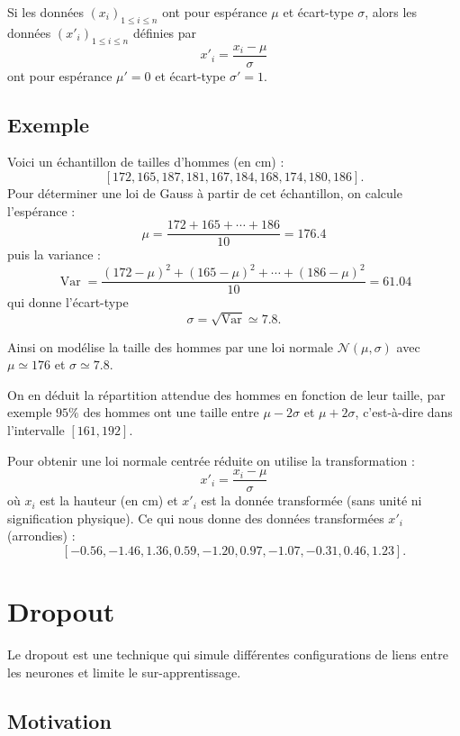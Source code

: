 \documentclass[11pt,class=report,crop=false]{standalone}
\begin{document}


Si les données $(x_i)_{1\le i \le n}$ ont pour espérance $\mu$ et écart-type $\sigma$,
alors les données $(x'_i)_{1\le i \le n}$ définies par 
$$x'_i = \frac{x_i-\mu}{\sigma}$$
ont pour espérance $\mu'=0$ et écart-type $\sigma'=1$.

\subsection{Exemple}
Voici un échantillon de tailles d'hommes (en cm) :
$$[172,165,187,181,167,184,168,174,180,186].$$
Pour déterminer une loi de Gauss à partir de cet échantillon, on calcule l'espérance :
$$\mu = \frac{172 + 165 + \cdots + 186}{10} = 176.4$$
puis la variance : 
$$\operatorname{Var} = \frac{(172-\mu)^2+(165-\mu)^2+\cdots + (186-\mu)^2}{10} = 61.04$$
qui donne l'écart-type
$$\sigma = \sqrt{\operatorname{Var}} \simeq 7.8.$$


Ainsi on modélise la taille des hommes par une loi normale $\mathcal{N}(\mu,\sigma)$
avec $\mu\simeq 176$ et $\sigma\simeq 7.8$.



On en déduit la répartition attendue des hommes en fonction de leur taille, par exemple 
$95\%$ des hommes ont une taille entre $\mu-2\sigma$ et $\mu+2\sigma$, c'est-à-dire dans l'intervalle $[161,192]$.

Pour obtenir une loi normale centrée réduite on utilise la transformation :
$$x'_i = \frac{x_i-\mu}{\sigma}$$
où $x_i$ est la hauteur (en cm) et $x'_i$ est la donnée transformée (sans unité ni signification physique).
Ce qui nous donne des données transformées $x'_i$ (arrondies) :
$$[-0.56, -1.46, 1.36,  0.59, -1.20,  0.97,  -1.07, -0.31, 0.46, 1.23].$$


\section{Dropout}

Le dropout est une technique qui simule différentes configurations de liens entre les neurones et limite le sur-apprentissage.


\subsection{Motivation}
\end{document}
